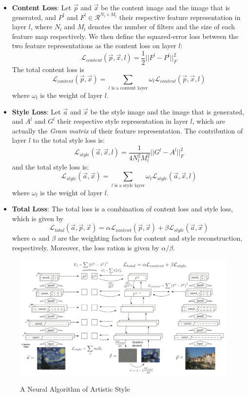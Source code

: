 \documentclass{article} %
\begin{document}
\begin{itemize}
\item \textbf{Content Loss}: Let $\vec{p}$ and $\vec{x}$ be the content image and the image that is generated, and $P^l$ and $F^l\in \mathcal{R}^{N_l\times M_l}$ their respective feature representation in layer $l$, where $N_l$ and $M_l$ denotes the number of filters and the size of each feature map respectively. We then define the squared-error loss between the two feature representations as the content loss on layer $l$:
$$\mathcal{L}_{content}(\vec{p}, \vec{x}, l)=\frac{1}{2}||F^l-P^l||_F^2$$
The total content loss is  $$\mathcal{L}_{content}(\vec{p},\vec{x})=\sum_{l \text{ is a content layer}}\omega_l\mathcal{L}_{content}(\vec{p},\vec{x},l)$$ where $\omega_l$ is the weight of layer $l$.
\item \textbf{Style Loss}: Let $\vec{a}$ and $\vec{x}$ be the style image and the image that is generated, and $A^l$ and $G^l$ their respective style representation in layer $l$, which are actually the \emph{Gram matrix} of their feature representation. The contribution of layer $l$ to the total style loss is:
$$\mathcal{L}_{style}(\vec{a}, \vec{x}, l)=\frac{1}{4N_l^2M_l^2}||G^l-A^l||_F^2$$
and the total style loss is:
$$\mathcal{L}_{style}(\vec{a},\vec{x})=\sum_{l \text{ is a style layer}}\omega_{l}\mathcal{L}_{style}(\vec{a}, \vec{x}, l)$$
where $\omega_l$ is the weight of layer $l$.
\item \textbf{Total Loss}: The total loss is a combination of content loss and style loss, which is given by $$\mathcal{L}_{total}(\vec{a},\vec{p},\vec{x})=\alpha \mathcal{L}_{content}(\vec{p},\vec{x}) + \beta \mathcal{L}_{style}(\vec{a},\vec{x})$$ where $\alpha$ and $\beta$ are the weighting factors for content and style reconstruction, respectively. Moreover, the loss ration is given by $\alpha/\beta$.
\end{itemize}
\begin{figure}[t]
\centering
\includegraphics[scale=0.35]{neuralstyletransfer.png}
\label{fig:naas}
\caption{A Neural Algorithm of Artistic Style}
\end{figure}
\end{document}

